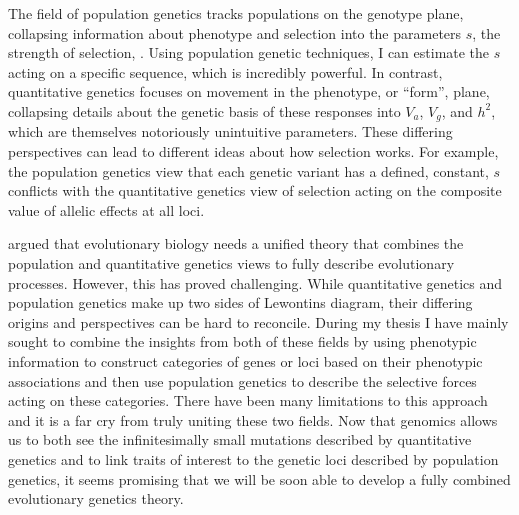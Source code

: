 The field of population genetics tracks populations on the genotype plane, collapsing information about phenotype and selection into the parameters $s$, the strength of selection, . Using population genetic techniques, I can estimate the $s$ acting on a specific sequence, which is incredibly powerful. In contrast, quantitative genetics focuses on movement in the phenotype, or “form”, plane, collapsing details about the genetic basis of these responses into $V_{a}$, $V_{g}$, and $h^{2}$, which are themselves notoriously unintuitive parameters. These differing perspectives can lead to different ideas about how selection works. For example, the population genetics view that each genetic variant has a defined, constant, $s$ conflicts with the quantitative genetics view of selection acting on the composite value of allelic effects at all loci.

\citet{lewontin1974} argued that evolutionary biology needs a unified theory that combines the population and quantitative genetics views to fully describe evolutionary processes. However, this has proved challenging. While quantitative genetics and population genetics make up two sides of Lewontin\textsc{}s diagram, their differing origins and perspectives can be hard to reconcile. During my thesis I have mainly sought to combine the insights from both of these fields by using phenotypic information to construct categories of genes or loci based on their phenotypic associations and then use population genetics to describe the selective forces acting on these categories. There have been many limitations to this approach and it is a far cry from truly uniting these two fields. Now that genomics allows us to both see the infinitesimally small mutations described by quantitative genetics and to link traits of interest to the genetic loci described by population genetics, it seems promising that we will be soon able to develop a fully combined evolutionary genetics theory.

